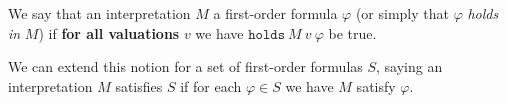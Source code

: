 \begin{definition}\label{fol-000E}%
We say that an interpretation $M$  a first-order
formula $\varphi$ (or simply that $\varphi$ \textit{holds in} $M$) if
\textbf{for all valuations} $v$ we have $\mathtt{holds}~M~v~\varphi$
be true.

We can extend this notion for a set of first-order formulas $S$, saying
an interpretation $M$ satisfies $S$ if for each $\varphi\in S$ we have
$M$ satisfy $\varphi$.
\end{definition}
